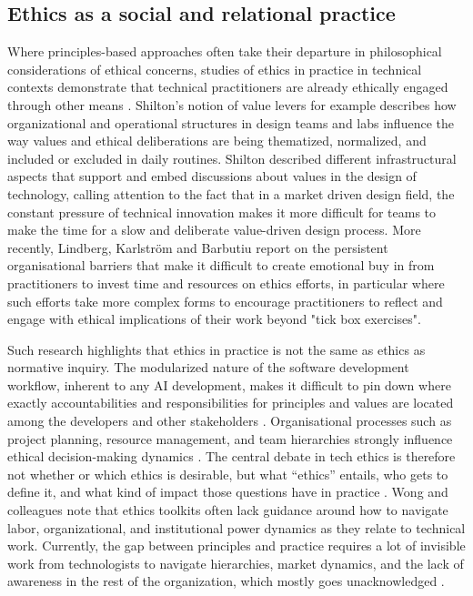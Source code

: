 \subsection{Ethics as a social and relational practice}
Where principles-based approaches often take their departure in philosophical considerations of ethical concerns, studies of ethics in practice in technical contexts demonstrate that technical practitioners are already ethically engaged through other means \cite{dindler2022engagements, widder2023s, wong2021tactics, ibanez2022operationalising, taylor2020constructing, deng_investigating_2023}. Shilton’s \cite{shilton2013values} notion of value levers for example describes how organizational and operational structures in design teams and labs influence the way values and ethical deliberations are being thematized, normalized, and included or excluded in daily routines. Shilton described different infrastructural aspects that support and embed discussions about values in the design of technology, calling attention to the fact that in a market driven design field, the constant pressure of technical innovation makes it more difficult for teams to make the time for a slow and deliberate value-driven design process. More recently, Lindberg, Karlström and Barbutiu \cite{lindberg2023cultivating} report on the persistent organisational barriers that make it difficult to create emotional buy in from practitioners to invest time and resources on ethics efforts, in particular where such efforts take more complex forms to encourage practitioners to reflect and engage with ethical implications of their work beyond "tick box exercises". 

Such research highlights that ethics in practice is not the same as ethics as normative inquiry. The modularized nature of the software development workflow, inherent to any AI development, makes it difficult to pin down where exactly accountabilities and responsibilities for principles and values are located among the developers and other stakeholders \cite{widder2023dislocated}. Organisational processes such as project planning, resource management, and team hierarchies strongly influence ethical decision-making dynamics \cite{devon_design_2004}. The central debate in tech ethics is therefore not whether or which ethics is desirable, but what “ethics” entails, who gets to define it, and what kind of impact those questions have in practice \cite{green_contestation_2021}. Wong and colleagues \cite{wong2023seeing} note that ethics toolkits often lack guidance around how to navigate labor, organizational, and institutional power dynamics as they relate to technical work. Currently, the gap between principles and practice requires a lot of invisible work from technologists to navigate hierarchies, market dynamics, and the lack of awareness in the rest of the organization, which mostly goes unacknowledged \cite{deng_investigating_2023, wang2023designing}. 

